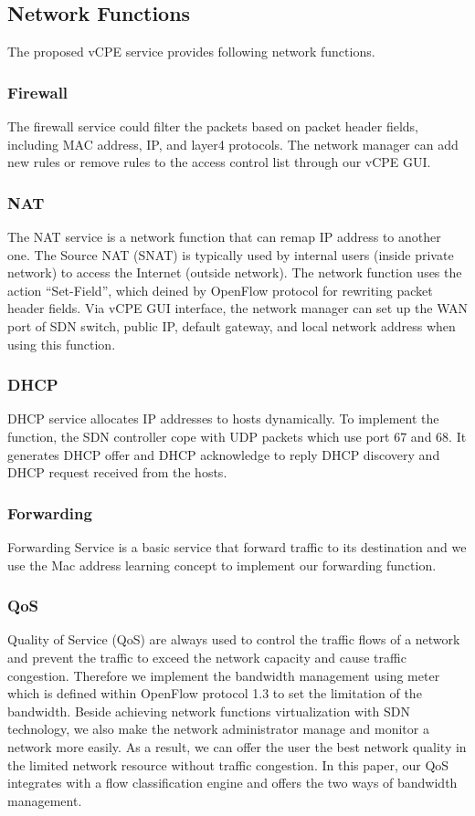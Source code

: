 \documentclass[journal]{IEEEtran}
\begin{document}
\subsection{Network Functions}
The proposed vCPE service provides following network functions.

\subsubsection{Firewall}
The firewall service could filter the packets based on packet header fields, including MAC address, IP, and layer4 protocols. The network manager can add new rules or remove rules to the access control list through our vCPE GUI.

\subsubsection{NAT}
The NAT service is a network function that can remap  IP address to another one. The Source NAT (SNAT) is typically used by internal users (inside private network) to access the Internet (outside network). The network function uses the action “Set-Field”, which deined by OpenFlow protocol for rewriting packet header fields. Via vCPE GUI interface, the network manager can set up the WAN port of SDN switch, public IP, default gateway, and local network address when using this function.

\subsubsection{DHCP}
DHCP service allocates IP addresses to hosts dynamically. To implement the function, the SDN controller cope with UDP packets which use port 67 and 68. It generates DHCP offer and DHCP acknowledge to reply DHCP discovery and DHCP request received from the hosts.

\subsubsection{Forwarding}
Forwarding Service is a basic service that forward traffic to its destination and we use the Mac address learning concept to implement our forwarding function.

\subsubsection{QoS}
Quality of Service (QoS) are always used to control the traffic flows of a network and prevent the traffic to exceed the network capacity and cause traffic congestion. Therefore we implement the bandwidth management using meter which is defined within OpenFlow protocol 1.3 to set the limitation of the bandwidth.
Beside achieving network functions virtualization with SDN technology, we also make the network administrator manage and monitor a network more easily. As a result, we can offer the user the best network quality in the limited network resource without traffic congestion.
In this paper, our QoS integrates with a flow classification engine and offers the two ways of bandwidth management.
\end{document}
